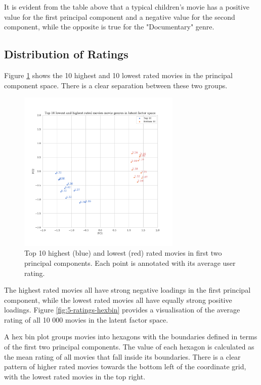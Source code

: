 It is evident from the table above that a typical children's movie has a positive value for the first principal component and a negative value for the second component, while the opposite is true for the "Documentary" genre.

\subsection{Distribution of Ratings}
Figure \ref{fig:5-ratings-scatter} shows the 10 highest and 10 lowest rated movies in the principal component space. There is a clear separation between these two groups.

\begin{figure}[H]
\centering
\includegraphics[width=0.69\textwidth]{Figures/5_ml10m-ratings-scatter.pdf}
\decoRule
\caption[Top 10 highest and lowest rated movies]{Top 10 highest (blue) and lowest (red) rated movies in first two principal components. Each point is annotated with its average user rating.}
\label{fig:5-ratings-scatter}
\end{figure}

The highest rated movies all have strong negative loadings in the first principal component, while the lowest rated movies all have equally strong positive loadings. Figure \ref{fig:5-ratings-hexbin} provides a visualisation of the average rating of all 10 000 movies in the latent factor space.

A hex bin plot groups movies into hexagons with the boundaries defined in terms of the first two principal components. The value of each hexagon is calculated as the mean rating of all movies that fall inside its boundaries. There is a clear pattern of higher rated movies towards the bottom left of the coordinate grid, with the lowest rated movies in the top right.

